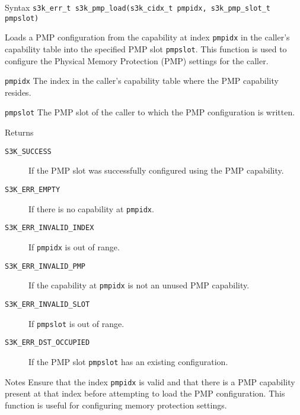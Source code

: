 \documentclass[a4paper,11pt]{article}
\newenvironment{syscalldoc}[1]{
  \begin{tcolorbox}[breakable,title=\subsection{\texttt{#1()}}]
  \begin{description}[leftmargin=!,style=nextline,noitemsep]
}{
  \end{description}
  \end{tcolorbox}
}
\begin{document}
\begin{syscalldoc}{s3k\_pmp\_load}
  \item[Syntax] \lstinline{s3k_err_t s3k_pmp_load(s3k_cidx_t pmpidx, s3k_pmp_slot_t pmpslot)}

  \item[Description] Loads a PMP configuration from the capability at index \verb|pmpidx| in the caller's capability table into the specified PMP slot \verb|pmpslot|. This function is used to configure the Physical Memory Protection (PMP) settings for the caller.

  \item[Parameters]
    \begin{description}
      \item[]
      \item[\texttt{pmpidx}] The index in the caller's capability table where the PMP capability resides.
      \item[\texttt{pmpslot}] The PMP slot of the caller to which the PMP configuration is written.
    \end{description}

  \item[Returns]
    \begin{description}
      \item[]
      \item[\texttt{S3K\_SUCCESS}] If the PMP slot was successfully configured using the PMP capability.
      \item[\texttt{S3K\_ERR\_EMPTY}] If there is no capability at \verb|pmpidx|.
      \item[\texttt{S3K\_ERR\_INVALID\_INDEX}] If \verb|pmpidx| is out of range.
      \item[\texttt{S3K\_ERR\_INVALID\_PMP}] If the capability at \verb|pmpidx| is not an unused PMP capability.
      \item[\texttt{S3K\_ERR\_INVALID\_SLOT}] If \verb|pmpslot| is out of range.
      \item[\texttt{S3K\_ERR\_DST\_OCCUPIED}] If the PMP slot \verb|pmpslot| has an existing configuration.
    \end{description}

  \item[Notes] Ensure that the index \verb|pmpidx| is valid and that there is a PMP capability present at that index before attempting to load the PMP configuration. This function is useful for configuring memory protection settings.
\end{syscalldoc}
\end{document}
